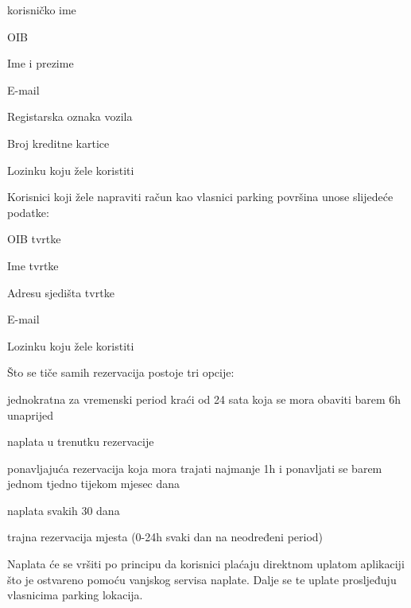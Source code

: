		\begin{packed_item}
			\item korisničko ime
			\item OIB
			\item Ime i prezime
			\item E-mail
			\item Registarska oznaka vozila
			\item Broj kreditne kartice
			\item Lozinku koju žele koristiti			
		\end{packed_item}
				
				
		\noindent Korisnici koji žele napraviti račun kao vlasnici parking površina unose slijedeće podatke:
		
		\begin{packed_item}
			\item OIB tvrtke
			\item Ime tvrtke
			\item Adresu sjedišta tvrtke
			\item E-mail
			\item Lozinku koju žele koristiti			
		\end{packed_item}
		
		\noindent Što se tiče samih rezervacija postoje tri opcije:
		
		\begin{packed_item}
			\item jednokratna za vremenski period kraći od 24 sata koja se mora obaviti barem 6h unaprijed
			
			\begin{packed_item}
				\item naplata u trenutku rezervacije
			\end{packed_item}
		
			\item ponavljajuća rezervacija koja mora trajati najmanje 1h i ponavljati se barem jednom tjedno tijekom mjesec dana
			
			\begin{packed_item}
				\item naplata svakih 30 dana
			\end{packed_item}
		
			\item trajna rezervacija mjesta (0-24h svaki dan na neodređeni period)
		\end{packed_item}
		
		Naplata će se vršiti po principu da korisnici plaćaju direktnom uplatom aplikaciji što je ostvareno pomoću vanjskog servisa naplate.
		Dalje se te uplate prosljeđuju vlasnicima parking lokacija.\\
		\clearpage
		
